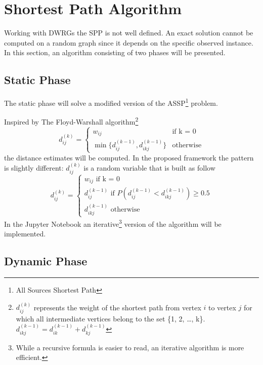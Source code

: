 \section{Shortest Path Algorithm}\label{ssp}

Working with DWRGs the SPP is not well defined.
An exact solution cannot be computed on a random graph since it depends on the specific observed instance.
In this section, an algorithm consisting of two phases will be presented.

\subsection{Static Phase}

The static phase will solve a modified version of the ASSP\footnote{All Sources Shortest Path} problem.

Inspired by The Floyd-Warshall\cite{cormen2010introduction} algorithm\footnote{$d_{ij}^{(k)}$ represents the weight of the shortest path from vertex $i$ to vertex $j$ for which all intermediate vertices belong to the set \{1, 2, \dots, k\}. $d_{ikj}^{(k-1)} = d_{ik}^{(k-1)} + d_{kj}^{(k-1)}$}
\begin{equation*}
	d_{ij}^{(k)} = 
	\begin{cases}
		w_{ij} & \text{if k = 0} \\
		\min\{d_{ij}^{(k-1)}, d_{ikj}^{(k-1)}\} & \text{otherwise}
	\end{cases}
\end{equation*}
the distance estimates will be computed.
In the proposed framework the pattern is slightly different: $d_{ij}^{(k)}$ is a random variable that is built as follow
\begin{equation*}
	d_{ij}^{(k)} = 
	\begin{cases}
		w_{ij} \text{ \ \ \ if k = 0} \\
		d_{ij}^{(k-1)} \text{ if } P(d_{ij}^{(k-1)} < d_{ikj}^{(k-1)}) \geq 0.5 \\
		d_{ikj}^{(k-1)} \text{ otherwise}
	\end{cases}
\end{equation*}
In the Jupyter Notebook an iterative\footnote{While a recursive formula is easier to read, an iterative algorithm is more efficient.} version of the algorithm will be implemented.
\subsection{Dynamic Phase}

